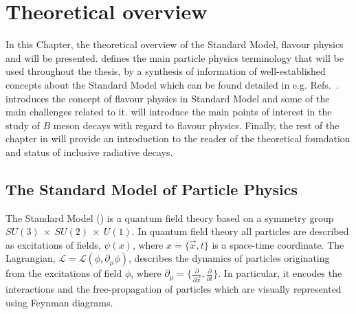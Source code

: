 \chapter{Theoretical overview}\label{ch:theory}

In this Chapter, the theoretical overview of the Standard Model, 
flavour physics and \BtoXsgamma will be presented.
 defines the main particle physics terminology that will be used throughout the thesis, by a synthesis of 
information of well-established concepts about the Standard Model which can be found detailed in e.g. Refs.~\cite{Peskin:1995ev,Thomson:2013zua,Griffiths:2008zz}.
 introduces the concept of flavour physics in Standard Model and some of the main challenges related to it.
 will introduce the main points of interest in the study of $B$ meson decays with regard to flavour physics.
Finally, the rest of the chapter in  will provide an introduction to the reader of the theoretical foundation and status of inclusive radiative decays.


\section{The Standard Model of Particle Physics} \label{sec:standard_model}
\begin{sloppy}
The Standard Model (\SM) is a quantum field theory based on a symmetry group $SU(3)~\times~SU(2)~\times~U(1)$.
In quantum field theory all particles are described as excitations of fields, $\psi(x)$, 
where $x=\{\vec{x},t\}$ is a space-time coordinate.
The Lagrangian, $\mathcal{L}=\mathcal{L}(\phi,\partial_{\mu}\phi)$, describes the dynamics of particles originating from the excitations of field $\phi$,
where $\partial_{\mu}=\{\frac{\partial}{\partial \vec{x}},\frac{\partial}{\partial t}\}$.
In particular, it encodes the interactions and the free-propagation of particles which are visually represented using Feynman diagrams.
\end{sloppy}

